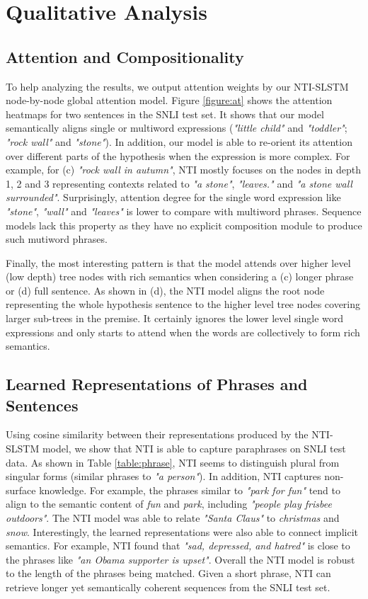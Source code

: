 \documentclass[11pt]{article}
\begin{document}
\section{Qualitative Analysis}

\subsection{Attention and Compositionality}
To help analyzing the results, we output attention weights by our NTI-SLSTM node-by-node global attention model. Figure \ref{figure:at} shows the attention heatmaps for two sentences in the SNLI test set. It shows that our model semantically aligns single or multiword expressions (\textit{"little child"} and \textit{"toddler"}; \textit{"rock wall"} and \textit{"stone"}). 
In addition, our model is able to re-orient its attention over different parts of the hypothesis when the expression is more complex. For example, for (c) \textit{"rock wall in autumn"}, NTI mostly focuses on the nodes in depth 1, 2 and 3 representing contexts related to \textit{"a stone"}, \textit{"leaves."} and \textit{"a stone wall surrounded"}. Surprisingly, attention degree for the single word expression like \textit{"stone"}, \textit{"wall"} and \textit{"leaves"} is lower to compare with multiword phrases. Sequence models lack this property as they have no explicit composition module to produce such mutiword phrases. 

Finally, the most interesting pattern is that the model attends over higher level (low depth) tree nodes with rich semantics when considering a (c) longer phrase or (d) full sentence. As shown in (d), the NTI model aligns the root node representing the whole hypothesis sentence to the higher level tree nodes covering larger sub-trees in the premise. It certainly ignores the lower level single word expressions and only starts to attend when the words are collectively to form rich semantics.

\subsection{Learned Representations of Phrases and Sentences}

Using cosine similarity 
between their representations produced by the NTI-SLSTM model, we show that NTI is able to capture paraphrases on SNLI test data. As shown in Table \ref{table:phrase}, NTI seems to distinguish plural from singular forms (similar phrases to \textit{"a person"}).  
In addition, NTI captures non-surface knowledge. For example, the phrases similar to \textit{"park for fun"} tend to align to the semantic content of \textit{fun} and \textit{park}, including \textit{"people play frisbee outdoors"}. The NTI model was able to relate \textit{"Santa Claus"} to \textit{christmas} and \textit{snow}. Interestingly, the learned representations were also able to connect implicit semantics. For example, NTI found that \textit{"sad, depressed, and hatred"} is close to the phrases like \textit{"an Obama supporter is upset"}. Overall the NTI model is robust to the length of the phrases being matched. Given a short phrase, NTI can retrieve longer yet semantically coherent sequences from the SNLI test set. 
\end{document}
